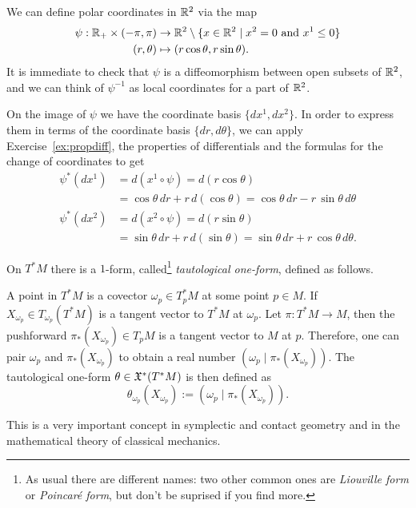 \begin{example}
  We can define polar coordinates in $\mathbb{R}^2$ via the map
  \begin{align}
    \psi : \mathbb{R}_+\times (-\pi, \pi) &\to \mathbb{R}^2\setminus\{x\in\mathbb{R}^2\mid x^2=0 \mbox{ and } x^1 \leq 0\}\\
    (r, \theta) &\mapsto (r\cos\theta, r\sin\theta).
  \end{align}
  It is immediate to check that $\psi$ is a diffeomorphism between open subsets of $\mathbb{R}^2$, and we can think of $\psi^{-1}$ as local coordinates for a part of $\mathbb{R}^2$.

  On the image of $\psi$ we have the coordinate basis $\{dx^1, dx^2\}$. In order to express them in terms of the coordinate basis $\{dr,d\theta\}$, we can apply Exercise~\ref{ex:propdiff}, the properties of differentials and the formulas for the change of coordinates to get
  \begin{align}
    \psi^*(d x^1) &= d(x^1\circ \psi) = d(r\cos\theta) \\
    &= \cos\theta \,dr +r\,d(\cos\theta) = \cos\theta \,dr -r\,\sin\theta\,d\theta\\
    \psi^*(d x^2) &= d(x^2\circ \psi) = d(r\sin\theta) \\
    &= \sin\theta \,dr +r\,d(\sin\theta) = \sin\theta \,dr +r\,\cos\theta\,d\theta.
  \end{align}
\end{example}

\begin{example}
  On $T^*M$ there is a $1$-form, called\footnote{As usual there are different names: two other common ones are \emph{Liouville form} or \emph{Poincar\'e form}, but don't be suprised if you find more.} \emph{tautological one-form}, defined as follows.

  A point in $T^*M$ is a covector $\omega_p\in T^*_p M$ at some point $p\in M$. If $X_{\omega_p}\in T_{\omega_p}(T^*M)$ is a tangent vector to $T^*M$ at $\omega_p$. Let $\pi:T^*M \to M$, then the pushforward $\pi_*(X_{\omega_p})\in T_p M$ is a tangent vector to $M$ at $p$.
  Therefore, one can pair $\omega_p$ and $\pi_*(X_{\omega_p})$ to obtain a real number $\left(\omega_p\;\big|\;\pi_*(X_{\omega_p})\right)$.
  The tautological one-form $\theta\in\mathfrak{X}^*(T^*M)$ is then defined as
  \begin{equation}
    \theta_{\omega_p}(X_{\omega_p}) := \left(\omega_p\;\Big|\;\pi_*(X_{\omega_p})\right).
  \end{equation}

  This is a very important concept in symplectic and contact geometry and in the mathematical theory of classical mechanics.
\end{example}

